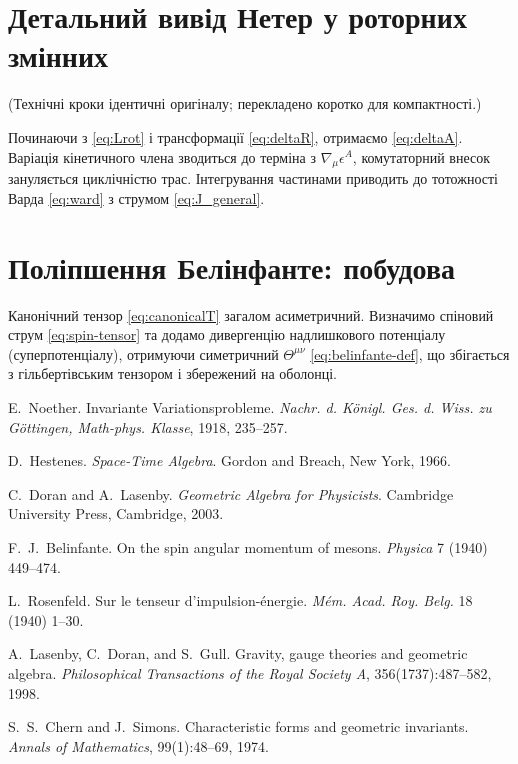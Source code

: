 \documentclass[11pt,a4paper]{article}
\numberwithin{equation}{section}
\theoremstyle{plain}
\theoremstyle{definition}
\theoremstyle{remark}
\begin{document}
\section{Детальний вивід Нетер у роторних змінних}
\label{app:noether-deriv}

(Технічні кроки ідентичні оригіналу; перекладено коротко для компактності.)

Починаючи з \eqref{eq:Lrot} і трансформації \eqref{eq:deltaR}, отримаємо \eqref{eq:deltaA}. Варіація кінетичного члена зводиться до терміна з $\nabla_\mu\epsilon^A$, комутаторний внесок зануляється циклічністю трас. Інтегрування частинами приводить до тотожності Варда \eqref{eq:ward} з струмом \eqref{eq:J_general}.

\section{Поліпшення Белінфанте: побудова}
\label{app:belinfante}

Канонічний тензор \eqref{eq:canonicalT} загалом асиметричний. Визначимо спіновий струм \eqref{eq:spin-tensor} та додамо дивергенцію надлишкового потенціалу (суперпотенціалу), отримуючи симетричний $\Theta^{\mu\nu}$ \eqref{eq:belinfante-def}, що збігається з гільбертівським тензором і збережений на оболонці.

\begin{thebibliography}{9}

E.~Noether.
\newblock Invariante Variationsprobleme.
\newblock \emph{Nachr. d. Königl. Ges. d. Wiss. zu Göttingen, Math-phys. Klasse}, 1918, 235--257.

D.~Hestenes.
\newblock \emph{Space-Time Algebra}.
\newblock Gordon and Breach, New York, 1966.

C.~Doran and A.~Lasenby.
\newblock \emph{Geometric Algebra for Physicists}.
\newblock Cambridge University Press, Cambridge, 2003.

F.~J.~Belinfante.
\newblock On the spin angular momentum of mesons.
\newblock \emph{Physica} 7 (1940) 449--474.

L.~Rosenfeld.
\newblock Sur le tenseur d'impulsion-énergie.
\newblock \emph{Mém. Acad. Roy. Belg.} 18 (1940) 1--30.

A.~Lasenby, C.~Doran, and S.~Gull.
\newblock Gravity, gauge theories and geometric algebra.
\newblock \emph{Philosophical Transactions of the Royal Society A}, 356(1737):487--582, 1998.

S.~S.~Chern and J.~Simons.
\newblock Characteristic forms and geometric invariants.
\newblock \emph{Annals of Mathematics}, 99(1):48--69, 1974.

\end{thebibliography}
\end{document}
